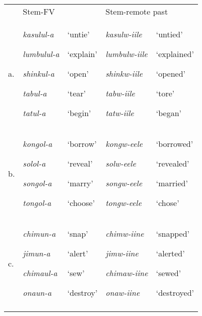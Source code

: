 \documentclass[output=paper]{langsci/langscibook}
\begin{document}
\begin{tabular}{lllll} & \multicolumn{2}{l}{\mdseries Stem-FV} & \multicolumn{2}{l}{\mdseries Stem-remote past}\\
\lsptoprule
\mdseries a. & {\mdseries \emph{kasulul-a}}

{\mdseries \emph{lumbulul-a}}

{\mdseries \emph{shinkul-a}}

{\mdseries \emph{tabul-a}}

\mdseries \emph{tatul-a} & {\mdseries ‘untie’}

{\mdseries ‘explain’}

{\mdseries ‘open’}

{\mdseries ‘tear’}

\mdseries ‘begin’ & {\mdseries \emph{kasulw-iile}}

{\mdseries \emph{lumbulw-iile}}

{\mdseries \emph{shinkw-iile}}

{\mdseries \emph{tabw-iile}}

\mdseries \emph{tatw-iile} & {\mdseries ‘untied’}

{\mdseries ‘explained’}

{\mdseries ‘opened’}

{\mdseries ‘tore’}

\mdseries ‘began’\\
\mdseries b. & {\mdseries \emph{kongol-a}}

{\mdseries \emph{solol-a}}

{\mdseries \emph{songol-a}}

\mdseries \emph{tongol-a} & {\mdseries ‘borrow’}

{\mdseries ‘reveal’}

{\mdseries ‘marry’}

\mdseries ‘choose’ & {\mdseries \emph{kongw-eele}}

{\mdseries \emph{solw-eele}}

{\mdseries \emph{songw-eele}}

\mdseries \emph{tongw-eele} & {\mdseries ‘borrowed’}

{\mdseries ‘revealed’}

{\mdseries ‘married’}

\mdseries ‘chose’\\
\mdseries c. & {\mdseries \emph{chimun-a}}

{\mdseries \emph{jimun-a}}

{\mdseries \emph{chimaul-a}}

\mdseries \emph{onaun-a} & {\mdseries ‘snap’}

{\mdseries ‘alert’}

{\mdseries ‘sew’}

\mdseries ‘destroy’ & {\mdseries \emph{chimw-iine}}

{\mdseries \emph{jimw-iine}}

{\mdseries \emph{chimaw-iine}}

\mdseries \emph{onaw-iine} & {\mdseries ‘snapped’}

{\mdseries ‘alerted’}

{\mdseries ‘sewed’}

\mdseries ‘destroyed’\\
\lspbottomrule
\end{tabular}
\end{document}
